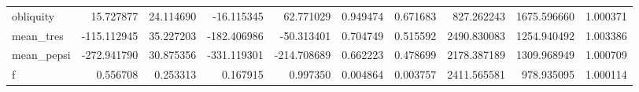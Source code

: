 \begin{tabular}{lrrrrrrrrr}
obliquity     &   15.727877 &  24.114690 &  -16.115345 &   62.771029 &   0.949474 &  0.671683 &   827.262243 &  1675.596660 &  1.000371 \\
mean\_tres     & -115.112945 &  35.227203 & -182.406986 &  -50.313401 &   0.704749 &  0.515592 &  2490.830083 &  1254.940492 &  1.003386 \\
mean\_pepsi    & -272.941790 &  30.875356 & -331.119301 & -214.708689 &   0.662223 &  0.478699 &  2178.387189 &  1309.968949 &  1.000709 \\
f             &    0.556708 &   0.253313 &    0.167915 &    0.997350 &   0.004864 &  0.003757 &  2411.565581 &   978.935095 &  1.000114 \\
\bottomrule
\end{tabular}
